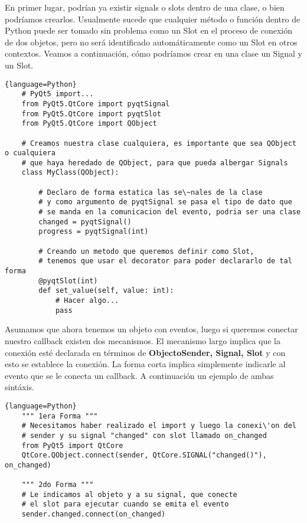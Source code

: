 En primer lugar, podr\'ian ya existir signals o slots dentro de una clase, o bien podr\'iamos crearlos. Usualmente sucede que cualquier m\'etodo o funci\'on dentro de Python
puede ser tomado sin problema como un Slot en el proceso de conexi\'on de dos objetos, pero no ser\'a identificado autom\'aticamente como un Slot en otros contextos.
Veamos a continuaci\'on, c\'omo podr\'iamos crear en una clase un Signal y un Slot.


\begin{lstlisting}{language=Python}
    # PyQt5 import...
    from PyQt5.QtCore import pyqtSignal
    from PyQt5.QtCore import pyqtSlot
    from PyQt5.QtCore import QObject

    # Creamos nuestra clase cualquiera, es importante que sea QObject o cualquiera
    # que haya heredado de QObject, para que pueda albergar Signals
    class MyClass(QObject):

        # Declaro de forma estatica las se\~nales de la clase
        # y como argumento de pyqtSignal se pasa el tipo de dato que
        # se manda en la comunicacion del evento, podria ser una clase
        changed = pyqtSignal()
        progress = pyqtSignal(int)

        # Creando un metodo que queremos definir como Slot,
        # tenemos que usar el decorator para poder declararlo de tal forma
        @pyqtSlot(int)
        def set_value(self, value: int):
            # Hacer algo...
            pass
\end{lstlisting}

Asumamos que ahora tenemos un objeto con eventos, luego si queremos conectar nuestro callback existen dos mecanismos. El mecanismo largo implica
que la conexi\'on est\'e declarada en t\'erminos de \textbf{ObjectoSender, Signal, Slot} y con esto se establece la conexi\'on. La forma corta implica simplemente indicarle al evento
que se le conecta un callback. A continuaci\'on un ejemplo de ambas sint\'axis.

\begin{lstlisting}{language=Python}
    """ 1era Forma """
    # Necesitamos haber realizado el import y luego la conexi\'on del
    # sender y su signal "changed" con slot llamado on_changed
    from PyQt5 import QtCore
    QtCore.QObject.connect(sender, QtCore.SIGNAL("changed()"), on_changed)

    """ 2do Forma """
    # Le indicamos al objeto y a su signal, que conecte
    # el slot para ejecutar cuando se emita el evento
    sender.changed.connect(on_changed)
\end{lstlisting}


